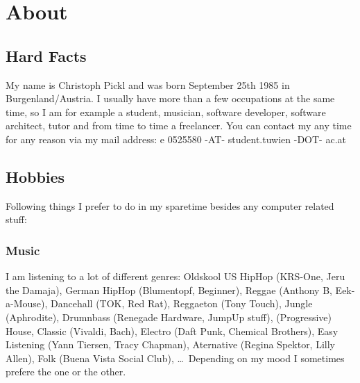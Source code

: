 
\section{About}




\subsection{Hard Facts}

My name is Christoph Pickl and was born September 25th 1985 in
Burgenland/Austria. I usually have more than a few occupations at the same
time, so I am for example a student, musician, software developer, software
architect, tutor and from time to time a freelancer.
You can contact my any time for any reason via my mail address: e 0525580 -AT-
student.tuwien -DOT- ac.at




\subsection{Hobbies}

Following things I prefer to do in my sparetime besides any computer related
stuff:


\subsubsection{Music}


I am listening to a lot of different genres: Oldskool US HipHop (KRS-One, Jeru
the Damaja), German HipHop (Blumentopf, Beginner), Reggae (Anthony B,
Eek-a-Mouse), Dancehall (TOK, Red Rat), Reggaeton (Tony Touch), Jungle
(Aphrodite), Drumnbass (Renegade Hardware, JumpUp stuff), (Progressive) House,
Classic (Vivaldi, Bach), Electro (Daft Punk, Chemical Brothers), Easy Listening
(Yann Tiersen, Tracy Chapman), Aternative (Regina Spektor, Lilly Allen), Folk (Buena Vista Social Club),
\ldots~Depending on my mood I sometimes prefere the one or the other.

